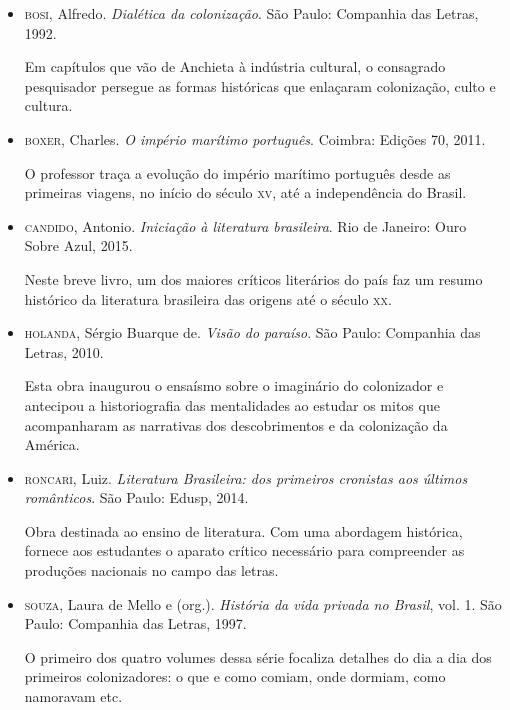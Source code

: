 \documentclass[12pt]{extarticle}
\begin{document}
\begin{itemize}
\item\textsc{bosi}, Alfredo. \textit{Dialética da colonização}. São Paulo: Companhia
das Letras, 1992.

Em capítulos que vão de Anchieta à indústria cultural, o consagrado
pesquisador persegue as formas históricas que enlaçaram colonização,
culto e cultura.

\item\textsc{boxer}, Charles. \textit{O império marítimo português}. Coimbra: Edições 70, 2011.

O professor traça a evolução do império marítimo português desde as
primeiras viagens, no início do século \textsc{xv}, até a independência do
Brasil.

\item\textsc{candido}, Antonio. \textit{Iniciação à literatura brasileira}. Rio de
Janeiro: Ouro Sobre Azul, 2015.

Neste breve livro, um dos maiores críticos literários do país faz um
resumo histórico da literatura brasileira das origens até o século \textsc{xx}.

\item\textsc{holanda}, Sérgio Buarque de. \textit{Visão do paraíso}. São Paulo:
Companhia das Letras, 2010.

Esta obra inaugurou o ensaísmo sobre o imaginário do colonizador e
antecipou a historiografia das mentalidades ao estudar os mitos que
acompanharam as narrativas dos descobrimentos e da colonização da
América.

\item\textsc{roncari}, Luiz. \textit{Literatura Brasileira: dos primeiros cronistas
aos últimos românticos}. São Paulo: Edusp, 2014.

Obra destinada ao ensino de literatura. Com uma abordagem histórica,
fornece aos estudantes o aparato crítico necessário para compreender as
produções nacionais no campo das letras.

\item\textsc{souza}, Laura de Mello e (org.). \textit{História da vida privada no
Brasil}, vol. 1. São Paulo: Companhia das Letras, 1997.

O primeiro dos quatro volumes dessa série focaliza detalhes do dia a dia
dos primeiros colonizadores: o que e como comiam, onde dormiam, como
namoravam etc.
\end{itemize}
\end{document}
